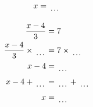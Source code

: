 \documentclass[12pt]{article}
\newcounter{minipagecount}
\begin{document}
\begin{multicols}{2}
\begin{minipage}[t]{0.45\textwidth}
\begin{align*}
        x &= \dotuline{\hspace{5mm}}\\
    \end{align*}
\end{minipage} %
\noindent{(\theminipagecount)}\hspace{0.1mm} %
\begin{minipage}[t]{0.45\textwidth} %
    \vspace{-26pt}  %
    \raggedright %
    \begin{align*} %
        \frac{x - 4}{3} &= 7\\
        \frac{x - 4}{3} \times\dotuline{\hspace{5mm}} &= 7 \times\dotuline{\hspace{5mm}}\\
        x - 4 &= \dotuline{\hspace{5mm}}\\
        x - 4 + \dotuline{\hspace{5mm}} &= \dotuline{\hspace{5mm}} + \dotuline{\hspace{5mm}}\\
        x &= \dotuline{\hspace{5mm}}\\
    \end{align*}
\end{minipage} %
\noindent{(\theminipagecount)}\hspace{0.1mm} %
\begin{minipage}[t]{0.45\textwidth} %
    \vspace{-26pt}  %

\end{minipage}
\end{multicols}
\end{document}
